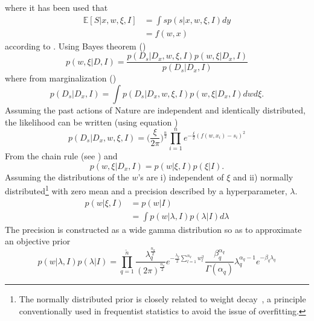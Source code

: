 where it has been used that
\begin{equation}
	\begin{split}
		\mathbb{E}[S|x,w,\xi,I] &= \int s p(s|x,w,\xi,I) dy\\
		&= f(w,x)
	\end{split}
\end{equation}
according to . Using Bayes theorem ()
\begin{equation}
	p(w,\xi|D,I) = \frac{p(D_s|D_x,w,\xi,I)p(w,\xi|D_x,I)}{p(D_s|D_x,I)}
	\label{eq:bayes2}
\end{equation}
where from marginalization ()
\begin{equation}
	p(D_s|D_x,I) = \int p(D_s|D_x,w,\xi,I)p(w,\xi|D_x,I) dw d\xi.
\end{equation}
Assuming the past actions of Nature are independent and identically distributed, the likelihood can be written (using equation )
\begin{equation}
	p(D_s|D_x,w,\xi,I) = \bigg(\frac{\xi}{2\pi}\bigg)^\frac{n}{2}\prod_{i=1}^n e^{-\frac{\xi}{2}(f(w,x_i)-s_i)^2}
	\label{reg:likelihood}
\end{equation}
From the chain rule (see ) and 
\begin{equation}
		p(w,\xi|D_x,I) = p(w|\xi,I)p(\xi|I).
\end{equation}
Assuming the distributions of the $w$'s are i) independent of $\xi$ and ii) normally distributed\footnote{The normally distributed prior is closely related to weight decay~\citep{Plaut1986}, a principle conventionally used in frequentist statistics to avoid the issue of overfitting.} with zero mean and a precision described by a hyperparameter, $\lambda$. 	 
\begin{equation}
	\begin{split}
		p(w|\xi,I) & = p(w|I)\\
		& = \int p(w|\lambda,I)p(\lambda|I)d\lambda
	\end{split}
	\label{eq:prior1}
\end{equation}
The precision is constructed as a wide gamma distribution so as to approximate an objective prior
\begin{equation}
	p(w|\lambda,I)p(\lambda|I)
	= \prod_{q=1}^{\tilde{n}} \frac{\lambda_q^\frac{n_q}{2}}{(2\pi)^\frac{n_q}{2}}e^{-\frac{\lambda_q}{2}\sum_{l=1}^{n_q}w_l^2}\frac{\beta_q^{\alpha_q}}{\Gamma(\alpha_q)}\lambda_q^{\alpha_q-1}e^{-\beta_q \lambda_q}
	\label{eq:prior}
\end{equation}
